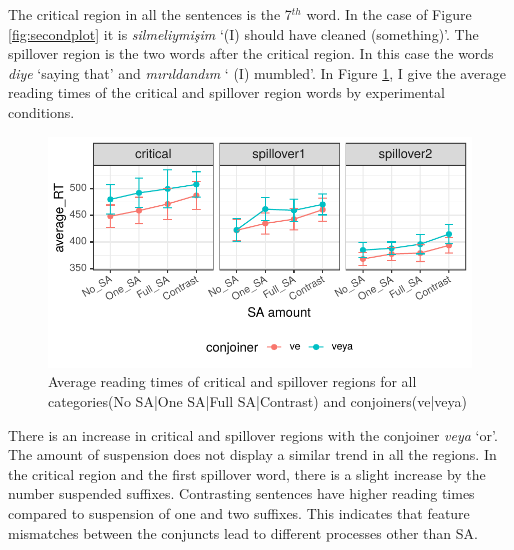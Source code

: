 The critical region in all the sentences is the 7$^{th}$ word. In the case of Figure \ref{fig:secondplot} it is \textit{silmeliymişim} `(I) should have cleaned (something)'. The spillover region is the two words after the critical region. In this case the words \textit{diye} `saying that' and \textit{mırıldandım} ` (I) mumbled'. In Figure \ref{fig:thirdplot}, I give the average reading times of the critical and spillover region words by experimental conditions.

\begin{knitrout}
\color{fgcolor}\begin{figure}[hbt!]

{\centering \includegraphics[]{experiments/selfpaced/report/figure/thirdplot-1.pdf} 

}

\caption[Average reading times of critical and spillover regions for all categories(No SA|One SA|Full SA|Contrast) and conjoiners(ve|veya)]{Average reading times of critical and spillover regions for all categories(No SA|One SA|Full SA|Contrast) and conjoiners(ve|veya)}\label{fig:thirdplot}
\end{figure}


\end{knitrout}

There is an increase in critical and spillover regions with the conjoiner \textit{veya} `or'. The amount of suspension does not display a similar trend in all the regions. In the critical region and the first spillover word, there is a slight increase by the number suspended suffixes. Contrasting sentences have higher reading times compared to suspension of one and two suffixes. This indicates that feature mismatches between the conjuncts lead to different processes other than SA.


